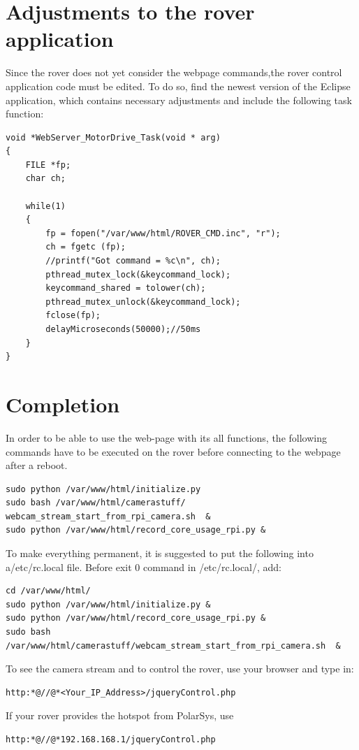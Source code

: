 \section{Adjustments to the rover application}
Since the rover does not yet consider the webpage commands,the rover control application code must be edited. To do so, find the newest version of the Eclipse application, which contains necessary adjustments and include the following task function:
\begin{lstlisting}
void *WebServer_MotorDrive_Task(void * arg)
{
	FILE *fp;
	char ch;

	while(1)
	{
		fp = fopen("/var/www/html/ROVER_CMD.inc", "r");
		ch = fgetc (fp);
		//printf("Got command = %c\n", ch);
		pthread_mutex_lock(&keycommand_lock);
		keycommand_shared = tolower(ch);
		pthread_mutex_unlock(&keycommand_lock);
		fclose(fp);
		delayMicroseconds(50000);//50ms
	}
}
\end{lstlisting}
\section{Completion}
In order to be able to use the web-page with its all functions, the following commands have to be executed on the rover before connecting to the webpage after a reboot.
\begin{lstlisting}
sudo python /var/www/html/initialize.py
sudo bash /var/www/html/camerastuff/ webcam_stream_start_from_rpi_camera.sh  &
sudo python /var/www/html/record_core_usage_rpi.py &
\end{lstlisting}
To make everything permanent, it is suggested to put the following into a/etc/rc.local file. Before exit 0 command in /etc/rc.local/, add:
\begin{lstlisting}
cd /var/www/html/
sudo python /var/www/html/initialize.py &
sudo python /var/www/html/record_core_usage_rpi.py &
sudo bash /var/www/html/camerastuff/webcam_stream_start_from_rpi_camera.sh  &
\end{lstlisting}

To see the camera stream and to control the rover, use your browser and type in:
\begin{lstlisting}[label={lst:1}]
http:*@//@*<Your_IP_Address>/jqueryControl.php
\end{lstlisting}
If your rover provides the hotspot from PolarSys, use
\begin{lstlisting}[label={lst:partWrkflw}]
http:*@//@*192.168.168.1/jqueryControl.php
\end{lstlisting}
